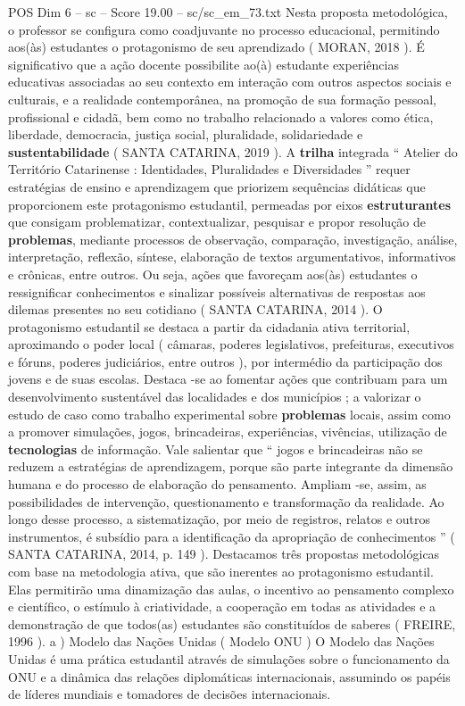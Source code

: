 \begin{textsample}{POS Dim 6 – sc – Score 19.00 – sc/sc\_em\_73.txt}
Nesta proposta metodológica, o professor se configura como coadjuvante no processo educacional, permitindo aos(às) estudantes o protagonismo de seu aprendizado ( MORAN, 2018 ).
É significativo que a ação docente possibilite ao(à) estudante experiências educativas associadas ao seu contexto em interação com outros aspectos sociais e culturais, e a realidade contemporânea, na promoção de sua formação pessoal, profissional e cidadã, bem como no trabalho relacionado a valores como ética, liberdade, democracia, justiça social, pluralidade, solidariedade e \textbf{sustentabilidade} ( SANTA CATARINA, 2019 ).
A \textbf{trilha} integrada “ Atelier do Território Catarinense : Identidades, Pluralidades e Diversidades ” requer estratégias de ensino e aprendizagem que priorizem sequências didáticas que proporcionem este protagonismo estudantil, permeadas por eixos \textbf{estruturantes} que consigam problematizar, contextualizar, pesquisar e propor resolução de \textbf{problemas}, mediante processos de observação, comparação, investigação, análise, interpretação, reflexão, síntese, elaboração de textos argumentativos, informativos e crônicas, entre outros.
Ou seja, ações que favoreçam aos(às) estudantes o ressignificar conhecimentos e sinalizar possíveis alternativas de respostas aos dilemas presentes no seu cotidiano ( SANTA CATARINA, 2014 ).
O protagonismo estudantil se destaca a partir da cidadania ativa territorial, aproximando o poder local ( câmaras, poderes legislativos, prefeituras, executivos e fóruns, poderes judiciários, entre outros ), por intermédio da participação dos jovens e de suas escolas.
Destaca -se ao fomentar ações que contribuam para um desenvolvimento sustentável das localidades e dos municípios ; a valorizar o estudo de caso como trabalho experimental sobre \textbf{problemas} locais, assim como a promover simulações, jogos, brincadeiras, experiências, vivências, utilização de \textbf{tecnologias} de informação.
Vale salientar que “ jogos e brincadeiras não se reduzem a estratégias de aprendizagem, porque são parte integrante da dimensão humana e do processo de elaboração do pensamento.
Ampliam -se, assim, as possibilidades de intervenção, questionamento e transformação da realidade.
Ao longo desse processo, a sistematização, por meio de registros, relatos e outros instrumentos, é subsídio para a identificação da apropriação de conhecimentos ” ( SANTA CATARINA, 2014, p. 149 ).
Destacamos três propostas metodológicas com base na metodologia ativa, que são inerentes ao protagonismo estudantil.
Elas permitirão uma dinamização das aulas, o incentivo ao pensamento complexo e científico, o estímulo à criatividade, a cooperação em todas as atividades e a demonstração de que todos(as) estudantes são constituídos de saberes ( FREIRE, 1996 ). a ) Modelo das Nações Unidas ( Modelo ONU ) O Modelo das Nações Unidas é uma prática estudantil através de simulações sobre o funcionamento da ONU e a dinâmica das relações diplomáticas internacionais, assumindo os papéis de líderes mundiais e tomadores de decisões internacionais.

\end{textsample}
